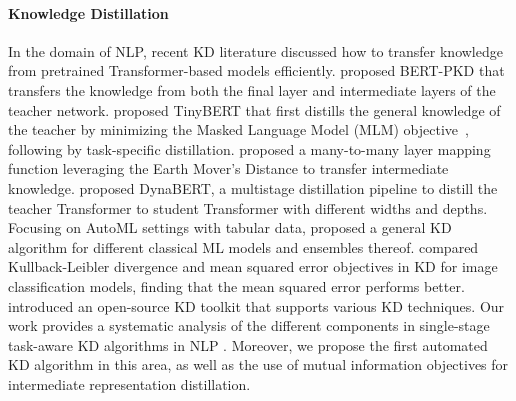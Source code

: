 \documentclass[11pt]{article}
\begin{document}
\paragraph{Knowledge Distillation}
In the domain of NLP, recent KD literature discussed how to transfer knowledge from pretrained Transformer-based models efficiently. \citet{sun2019patient} proposed BERT-PKD that transfers the knowledge from both the final layer and intermediate layers of the teacher network. \citet{jiao2019tinybert} proposed TinyBERT that first distills the general knowledge of the teacher by minimizing the Masked Language Model (MLM) objective~\citep{devlin2018bert}, following by task-specific distillation. \citet{li2020bert} proposed a many-to-many layer mapping function leveraging the Earth Mover’s Distance to transfer intermediate knowledge. \citet{hou2020dynabert} proposed DynaBERT, a multistage distillation pipeline to distill the teacher Transformer to student Transformer with different widths and depths. Focusing on AutoML settings with tabular data, \citet{fakoor2020fast} proposed a general KD algorithm for different classical ML models and ensembles thereof.
\citet{kim2021comparing} compared Kullback-Leibler divergence and mean squared error objectives in KD for image classification models, finding that the mean squared error performs better. 
\cite{textbrewer-acl2020-demo} introduced an open-source KD toolkit that supports various KD techniques.
Our work provides a systematic analysis of the different components in  single-stage task-aware KD algorithms in NLP . Moreover, we propose the first automated KD algorithm in this area, as well as the use of mutual information objectives for intermediate representation distillation.
\end{document}

